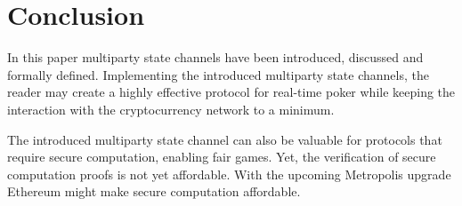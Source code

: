 \section{Conclusion}

In this paper multiparty state channels have been introduced, discussed and formally defined. Implementing the introduced multiparty state channels, the reader may create a highly effective protocol for real-time poker while keeping the interaction with the cryptocurrency network to a minimum.

The introduced multiparty state channel can also be valuable for protocols that require secure computation, enabling fair games. Yet, the verification of secure computation proofs is not yet affordable. With the upcoming Metropolis upgrade Ethereum might make secure computation affordable.
